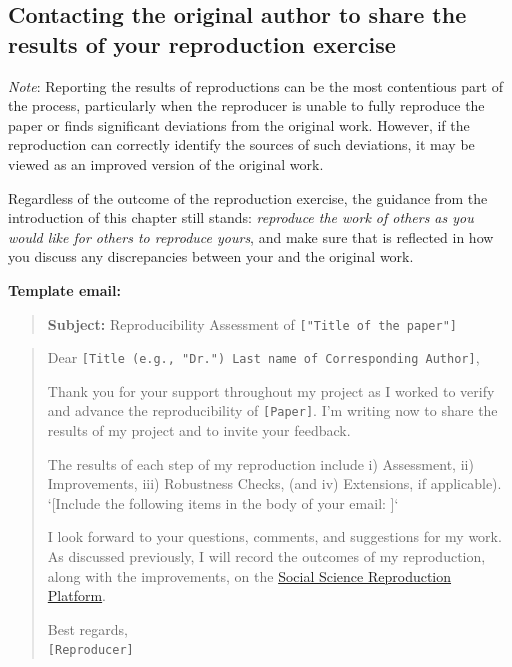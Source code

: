 \documentclass[
  openany]{book}
\begin{document}
\hypertarget{contacting-the-original-author-to-share-the-results-of-your-reproduction-exercise}{%
\subsection{Contacting the original author to share the results of your reproduction exercise}\label{contacting-the-original-author-to-share-the-results-of-your-reproduction-exercise}}

\emph{Note}: Reporting the results of reproductions can be the most contentious part of the process, particularly when the reproducer is unable to fully reproduce the paper or finds significant deviations from the original work. However, if the reproduction can correctly identify the sources of such deviations, it may be viewed as an improved version of the original work.

Regardless of the outcome of the reproduction exercise, the guidance from the introduction of this chapter still stands: \emph{reproduce the work of others as you would like for others to reproduce yours}, and make sure that is reflected in how you discuss any discrepancies between your and the original work.

\textbf{Template email:}

\begin{quote}
\textbf{Subject:} Reproducibility Assessment of \texttt{{[}"Title\ of\ the\ paper"{]}}
\end{quote}

\begin{quote}
Dear \texttt{{[}Title\ (e.g.,\ "Dr.")\ Last\ name\ of\ Corresponding\ Author{]}},

Thank you for your support throughout my project as I worked to verify and advance the reproducibility of \texttt{{[}Paper{]}}. I'm writing now to share the results of my project and to invite your feedback.

The results of each step of my reproduction include i) Assessment, ii) Improvements, iii) Robustness Checks, (and iv) Extensions, if applicable).\\
`{[}Include the following items in the body of your email: {]}`

I look forward to your questions, comments, and suggestions for my work. As discussed previously, I will record the outcomes of my reproduction, along with the improvements, on the \href{https://www.socialsciencereproduction.org/}{Social Science Reproduction Platform}.

Best regards,\\
\texttt{{[}Reproducer{]}}
\end{quote}
\end{document}
